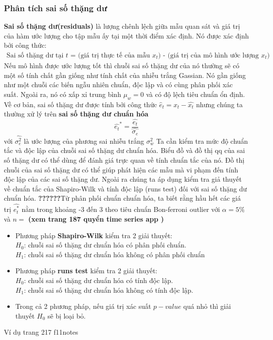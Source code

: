 \documentclass[twoside,12pt]{Latex/Classes/PhDthesisPSnPDF}
\begin{document}
\subsubsection{Phân tích sai số thặng dư}
\textbf{Sai số thặng dư(residuals)} là lượng chênh lệch giữa mẫu quan sát và giá trị của hàm ước lượng cho tập mẫu ấy tại một thời điểm xác định. Nó được xác định bởi công thức:
\begin{align}
	\text{Sai số thặng dư tại $t$ = (giá trị thực tế của mẫu $x_t$) - (giá trị của mô hình ước lượng $x_t$)}
\end{align}
Nếu mô hình được ước lượng tốt thì chuỗi sai số thặng dư của nó thường sẽ có một số tính chất gần giống như tính chất của nhiễu trắng Gassian. Nó gần giống như một chuỗi các biến ngẫu nhiên chuẩn, độc lập và có cùng phân phối xác suất. Ngoài ra, nó có xấp xỉ trung bình $\mu_w = 0$ và có độ lệch tiêu chuẩn ổn định. 
Về cơ bản, sai số thặng dư được tính bởi công thức $\hat{e}_t = x_t - \hat{x_t}$ nhưng chúng ta thường xử lý trên \textbf{sai số thặng dư chuẩn hóa} 
\begin{equation}
	\hat{e_t}^* = \frac{\hat{e_t}}{\hat{\sigma_e}}
\end{equation}
với $\hat{\sigma^2_e}$ là ước lượng của phương sai nhiễu trắng $\sigma_w^2$
Ta cần kiểm tra mức độ chuẩn tắc và độc lập của chuỗi sai số thặng dư chuẩn hóa. 
Biểu đồ và đồ thị qq của sai số thặng dư có thể dùng để đánh giá trực quan về tính chuẩn tắc của nó. Đồ thị chuỗi của sai số thặng dư có thể giúp phát hiện các mẫu mà vi phạm đến tính độc lập của các sai số thặng dư. Ngoài ra chúng ta áp dụng kiểm tra giả thuyết về chuẩn tắc của Shapiro-Wilk và tính độc lập (runs test) đối với sai số thặng dư chuẩn hóa.
\textbf{??????}Từ phân phối chuẩn chuẩn hóa, ta biết rằng hầu hết các giá trị $\hat{e_t^*}$ nằm trong khoảng -3 đến 3 theo tiêu chuẩn  Bon-ferroni outlier với $\alpha = 5\%$ và $n = $ \textbf{(xem trang 187  quyển time series app )}
\begin{itemize}
\item Phương pháp \textbf{Shapiro-Wilk} kiểm tra 2 giải thuyết:\\
	 $H_0$: chuỗi sai số thặng dư chuẩn hóa có phân phối chuẩn.\\
	$H_1$: chuỗi sai số thặng dư chuẩn hóa không có phân phối chuẩn
	\item Phương pháp \textbf{runs test} kiểm tra 2 giải thuyết:\\
	$H_0$: chuỗi sai số thặng dư chuẩn hóa có tính độc lập.\\
	$H_1$: chuỗi sai số thặng dư chuẩn hóa không có tính độc lập.
	\item Trong cả 2 phương pháp, nếu giá trị xác suất $p-value$ quá nhỏ thì giải thuyết $H_0$ sẽ bị loại bỏ.
\end{itemize}
Ví dụ trang 217 f11notes
\end{document}

